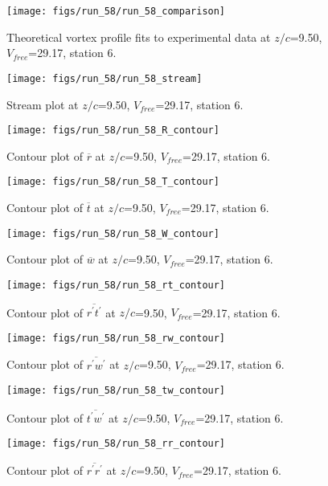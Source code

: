 \begin{figure}[H]
\centering
\texttt{[image: figs/run\_58/run\_58\_comparison]}
\caption{Theoretical vortex profile fits to experimental data at $z/c$=9.50, $V_{free}$=29.17, station 6.}
\end{figure}


\begin{figure}[H]
\centering
\texttt{[image: figs/run\_58/run\_58\_stream]}
\caption{Stream plot at $z/c$=9.50, $V_{free}$=29.17, station 6.}
\end{figure}


\begin{figure}[H]
\centering
\texttt{[image: figs/run\_58/run\_58\_R\_contour]}
\caption{Contour plot of $\overline{r}$ at $z/c$=9.50, $V_{free}$=29.17, station 6.}
\end{figure}


\begin{figure}[H]
\centering
\texttt{[image: figs/run\_58/run\_58\_T\_contour]}
\caption{Contour plot of $\overline{t}$ at $z/c$=9.50, $V_{free}$=29.17, station 6.}
\end{figure}


\begin{figure}[H]
\centering
\texttt{[image: figs/run\_58/run\_58\_W\_contour]}
\caption{Contour plot of $\overline{w}$ at $z/c$=9.50, $V_{free}$=29.17, station 6.}
\end{figure}


\begin{figure}[H]
\centering
\texttt{[image: figs/run\_58/run\_58\_rt\_contour]}
\caption{Contour plot of $\overline{r^\prime t^\prime}$ at $z/c$=9.50, $V_{free}$=29.17, station 6.}
\end{figure}


\begin{figure}[H]
\centering
\texttt{[image: figs/run\_58/run\_58\_rw\_contour]}
\caption{Contour plot of $\overline{r^\prime w^\prime}$ at $z/c$=9.50, $V_{free}$=29.17, station 6.}
\end{figure}


\begin{figure}[H]
\centering
\texttt{[image: figs/run\_58/run\_58\_tw\_contour]}
\caption{Contour plot of $\overline{t^\prime w^\prime}$ at $z/c$=9.50, $V_{free}$=29.17, station 6.}
\end{figure}


\begin{figure}[H]
\centering
\texttt{[image: figs/run\_58/run\_58\_rr\_contour]}
\caption{Contour plot of $\overline{r^\prime r^\prime}$ at $z/c$=9.50, $V_{free}$=29.17, station 6.}
\end{figure}


